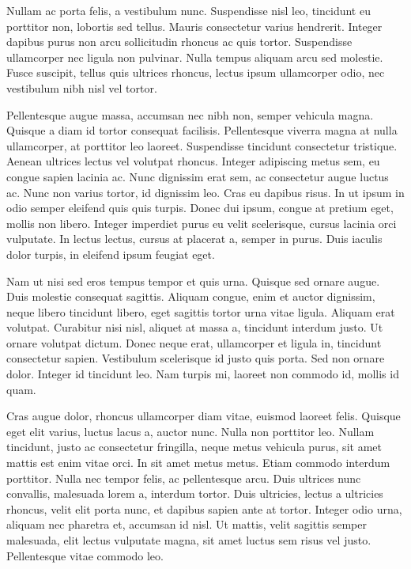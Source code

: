 \documentclass[]{article}
\begin{document}
Nullam ac porta felis, a vestibulum nunc. Suspendisse nisl leo, tincidunt eu porttitor non, lobortis sed tellus. Mauris consectetur varius hendrerit. Integer dapibus purus non arcu sollicitudin rhoncus ac quis tortor. Suspendisse ullamcorper nec ligula non pulvinar. Nulla tempus aliquam arcu sed molestie. Fusce suscipit, tellus quis ultrices rhoncus, lectus ipsum ullamcorper odio, nec vestibulum nibh nisl vel tortor.

Pellentesque augue massa, accumsan nec nibh non, semper vehicula magna. Quisque a diam id tortor consequat facilisis. Pellentesque viverra magna at nulla ullamcorper, at porttitor leo laoreet. Suspendisse tincidunt consectetur tristique. Aenean ultrices lectus vel volutpat rhoncus. Integer adipiscing metus sem, eu congue sapien lacinia ac. Nunc dignissim erat sem, ac consectetur augue luctus ac. Nunc non varius tortor, id dignissim leo. Cras eu dapibus risus. In ut ipsum in odio semper eleifend quis quis turpis. Donec dui ipsum, congue at pretium eget, mollis non libero. Integer imperdiet purus eu velit scelerisque, cursus lacinia orci vulputate. In lectus lectus, cursus at placerat a, semper in purus. Duis iaculis dolor turpis, in eleifend ipsum feugiat eget.

Nam ut nisi sed eros tempus tempor et quis urna. Quisque sed ornare augue. Duis molestie consequat sagittis. Aliquam congue, enim et auctor dignissim, neque libero tincidunt libero, eget sagittis tortor urna vitae ligula. Aliquam erat volutpat. Curabitur nisi nisl, aliquet at massa a, tincidunt interdum justo. Ut ornare volutpat dictum. Donec neque erat, ullamcorper et ligula in, tincidunt consectetur sapien. Vestibulum scelerisque id justo quis porta. Sed non ornare dolor. Integer id tincidunt leo. Nam turpis mi, laoreet non commodo id, mollis id quam.

Cras augue dolor, rhoncus ullamcorper diam vitae, euismod laoreet felis. Quisque eget elit varius, luctus lacus a, auctor nunc. Nulla non porttitor leo. Nullam tincidunt, justo ac consectetur fringilla, neque metus vehicula purus, sit amet mattis est enim vitae orci. In sit amet metus metus. Etiam commodo interdum porttitor. Nulla nec tempor felis, ac pellentesque arcu. Duis ultrices nunc convallis, malesuada lorem a, interdum tortor. Duis ultricies, lectus a ultricies rhoncus, velit elit porta nunc, et dapibus sapien ante at tortor. Integer odio urna, aliquam nec pharetra et, accumsan id nisl. Ut mattis, velit sagittis semper malesuada, elit lectus vulputate magna, sit amet luctus sem risus vel justo. Pellentesque vitae commodo leo.
\end{document}
